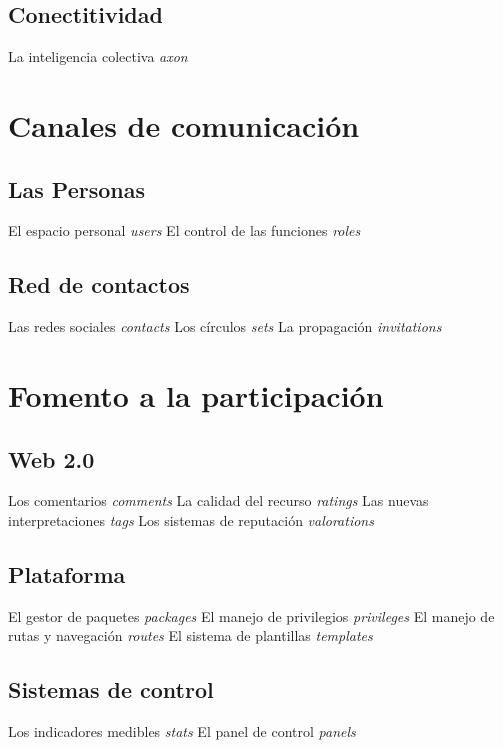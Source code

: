 \subsection{Conectitividad}
La inteligencia colectiva \emph{axon}

\section{Canales de comunicación}
\subsection{Las Personas}
El espacio personal \emph{users}
El control de las funciones \emph{roles}
\subsection{Red de contactos}
Las redes sociales \emph{contacts}
Los círculos \emph{sets}
La propagación \emph{invitations}

\section{Fomento a la participación}
\subsection{Web 2.0}
Los comentarios \emph{comments}
La calidad del recurso \emph{ratings}
Las nuevas interpretaciones \emph{tags}
Los sistemas de reputación \emph{valorations}
\subsection{Plataforma}
El gestor de paquetes \emph{packages}
El manejo de privilegios \emph{privileges}
El manejo de rutas y navegación \emph{routes}
El sistema de plantillas \emph{templates}
\subsection{Sistemas de control}
Los indicadores medibles \emph{stats}
El panel de control \emph{panels}
